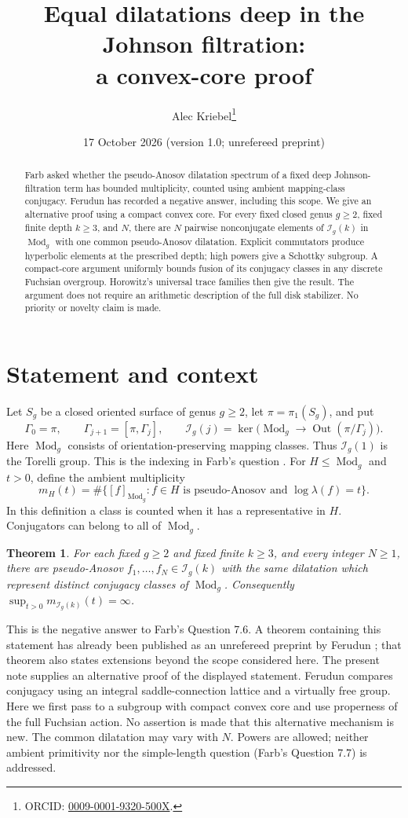 \documentclass[11pt]{article}
\title{Equal dilatations deep in the Johnson filtration:\\a convex-core proof}
\author{Alec Kriebel\thanks{ORCID: \href{https://orcid.org/0009-0001-9320-500X}{0009-0001-9320-500X}.}}
\date{17 October 2026 \quad (version 1.0; unrefereed preprint)}
\newtheorem{theorem}{Theorem}
\theoremstyle{remark}\newtheorem*{remark}{Remark}
\newcommand{\Mod}{\operatorname{Mod}}
\newcommand{\Out}{\operatorname{Out}}
\newcommand{\I}{\mathcal I}
\begin{document}
\maketitle
\begin{abstract}
Farb asked whether the pseudo-Anosov dilatation spectrum of a fixed deep
Johnson-filtration term has bounded multiplicity, counted using ambient
mapping-class conjugacy. Ferudun has recorded a negative answer, including
this scope. We give an alternative proof using a compact convex core.
For every fixed closed genus $g\ge2$, fixed finite depth $k\ge3$, and $N$,
there are $N$ pairwise nonconjugate elements of $\I_g(k)$ in $\Mod_g$
with one common pseudo-Anosov dilatation. Explicit commutators produce
hyperbolic elements at the prescribed depth; high powers give a Schottky
subgroup. A compact-core argument uniformly bounds fusion of its conjugacy
classes in any discrete Fuchsian overgroup. Horowitz's universal trace
families then give the result. The argument does not require an arithmetic
description of the full disk stabilizer. No priority or novelty claim is made.
\end{abstract}

\section{Statement and context}
Let $S_g$ be a closed oriented surface of genus $g\ge2$, let
$\pi=\pi_1(S_g)$, and put
\[
 \Gamma_0=\pi,\qquad \Gamma_{j+1}=[\pi,\Gamma_j],\qquad
 \I_g(j)=\ker\bigl(\Mod_g\longrightarrow\Out(\pi/\Gamma_j)\bigr).
\]
Here $\Mod_g$ consists of orientation-preserving mapping classes.
Thus $\I_g(1)$ is the Torelli group. This is the indexing in
Farb's question \cite[\S1.2 and Question 7.6]{Farb}.
For $H\le\Mod_g$ and $t>0$, define the ambient multiplicity
\[
 m_H(t)=\#\{[f]_{\Mod_g}: f\in H\text{ is pseudo-Anosov and }
                         \log\lambda(f)=t\}.
\]
In this definition a class is counted when it has a representative in $H$.
Conjugators can belong to all of $\Mod_g$.

\begin{theorem}\label{thm:main}
For each fixed $g\ge2$ and fixed finite $k\ge3$, and every integer $N\ge1$,
there are pseudo-Anosov $f_1,\ldots,f_N\in\I_g(k)$ with the same dilatation
which represent distinct conjugacy classes of $\Mod_g$.
Consequently $\sup_{t>0}m_{\I_g(k)}(t)=\infty$.
\end{theorem}

This is the negative answer to Farb's Question 7.6. A theorem containing
this statement has already been published as an unrefereed preprint by
Ferudun \cite[Theorem 1.1]{Ferudun}; that theorem also states extensions
beyond the scope considered here. The present note supplies an alternative
proof of the displayed statement. Ferudun compares conjugacy using an
integral saddle-connection lattice and a virtually free group. Here we
first pass to a subgroup with compact convex core and use properness of
the full Fuchsian action. No assertion is made that this alternative
mechanism is new. The common dilatation may vary with $N$. Powers are
allowed; neither ambient primitivity nor the simple-length question
(Farb's Question 7.7) is addressed.
\end{document}
